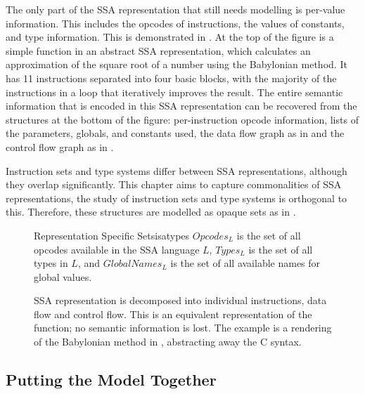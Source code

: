     The only part of the SSA representation that still needs modelling is
    per-value information.
    This includes the opcodes of instructions, the values of constants,
    and type information.
    This is demonstrated in .
    At the top of the figure is a simple function in an abstract SSA
    representation, which calculates an approximation of the square root of a
    number using the Babylonian method.
    It has 11 instructions separated into four basic blocks, with the majority
    of the instructions in a loop that iteratively improves the result.
    The entire semantic information that is encoded in this SSA representation
    can be recovered from the structures at the bottom of the figure:
    per-instruction opcode information, lists of the parameters, globals, and
    constants used, the data flow graph as in  and the control
    flow graph as in .

    Instruction sets and type systems differ between SSA representations,
    although they overlap significantly.
    This chapter aims to capture commonalities of SSA representations, the study
    of instruction sets and type systems is orthogonal to this.
    Therefore, these structures are modelled as opaque sets as in
    .

\begin{figure}[h]
\begin{definition}{Representation Specific Sets}{isatypes}
    $Opcodes_L$ is the set of all opcodes available in the SSA language $L$,
    $Types_L$ is the set of all types in $L$,
    and $GlobalNames_L$ is the set of all available names for global values.
\end{definition}
\end{figure}

\begin{figure}[p]

\caption{SSA representation is decomposed into individual instructions, data
         flow and control flow.
         This is an equivalent representation of the function; no semantic
         information is lost.
         The example is a rendering of the Babylonian method in
         , abstracting away the C syntax.
         \parfillskip=0pt}
\label{fig:separation}
\end{figure}

\subsection{Putting the Model Together}

